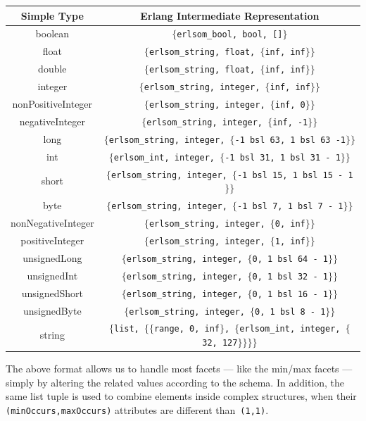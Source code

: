 \documentclass[copyright]{eptcs}
\begin{document}
\begin{center}\footnotesize
  \begin{tabular}{cc}
    \toprule
    Simple Type & Erlang Intermediate Representation \\
    \midrule
    boolean & \texttt{$\{$erlsom\_bool, bool, []$\}$}\\
    float & \texttt{$\{$erlsom\_string, float, $\{$inf, inf$\}\}$}\\
    double & \texttt{$\{$erlsom\_string, float, $\{$inf, inf$\}\}$}\\
    integer & \texttt{$\{$erlsom\_string, integer, $\{$inf, inf$\}\}$}\\
    nonPositiveInteger & \texttt{$\{$erlsom\_string, integer, $\{$inf, 0$\}\}$}\\
    negativeInteger & \texttt{$\{$erlsom\_string, integer, $\{$inf, -1$\}\}$}\\
    long & \texttt{$\{$erlsom\_string, integer, $\{$-1 bsl 63, 1 bsl 63 -1$\}\}$}\\
    int & \texttt{$\{$erlsom\_int, integer, $\{$-1 bsl 31, 1 bsl 31 - 1$\}\}$}\\
    short & \texttt{$\{$erlsom\_string, integer, $\{$-1 bsl 15, 1 bsl 15 - 1$\}\}$}\\
    byte & \texttt{$\{$erlsom\_string, integer, $\{$-1 bsl 7, 1 bsl 7 - 1$\}\}$}\\
    nonNegativeInteger & \texttt{$\{$erlsom\_string, integer, $\{$0, inf$\}\}$}\\
    positiveInteger & \texttt{$\{$erlsom\_string, integer, $\{$1, inf$\}\}$}\\
    unsignedLong & \texttt{$\{$erlsom\_string, integer, $\{$0, 1 bsl 64 - 1$\}\}$}\\
    unsignedInt & \texttt{$\{$erlsom\_string, integer, $\{$0, 1 bsl 32 - 1$\}\}$}\\
    unsignedShort & \texttt{$\{$erlsom\_string, integer, $\{$0, 1 bsl 16 - 1$\}\}$}\\
    unsignedByte & \texttt{$\{$erlsom\_string, integer, $\{$0, 1 bsl 8 - 1$\}\}$}\\
    string & \texttt{$\{$list, $\{\{$range, 0, inf$\}$, $\{$erlsom\_int, integer, $\{$32, 127$\}\}\}\}$}\\
    \bottomrule
  \end{tabular}
\end{center}

The above format allows us to handle most facets --- like the min/max facets ---
simply by altering the related values according to the schema. In addition, the
same list tuple is used to combine elements inside complex structures, when
their \texttt{(minOccurs,maxOccurs)} attributes are different than~\texttt{(1,1)}.
\end{document}
